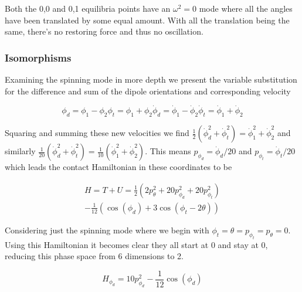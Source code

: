 \documentclass[prb,preprint]{revtex4-1}
\begin{document}
Both the 0,0 and 0,1 equilibria points have an $\omega^2=0$ mode where all the angles have been translated by some equal amount. With all the translation being the same, there's no restoring force and thus no oscillation.


\subsubsection{Isomorphisms} Examining the spinning mode in more depth we present the variable substitution for the difference and sum of the dipole orientations and corresponding velocity

\begin{subequations}
	\begin{equation}
		\phi_d = \phi_1-\phi_2
	\end{equation}
	\begin{equation}
		\phi_t = \phi_1+\phi_2
	\end{equation}
	\begin{equation}
		\dot\phi_d = \dot\phi_1-\dot\phi_2
	\end{equation}
	\begin{equation}
		\dot\phi_t = \dot\phi_1+\dot\phi_2
	\end{equation}
\end{subequations}

Squaring and summing these new velocities we find 
$\frac{1}{2}(\dot\phi_d^2 + \dot\phi_t^2) = \dot\phi_1^2+\dot\phi_2^2$ and similarly $\frac{1}{20}(\dot\phi_d^2 + \dot\phi_t^2) = \frac{1}{10}(\dot\phi_1^2+\dot\phi_2^2)$.
This means $p_{\phi_d}=\dot\phi_d/20$ and $p_{\phi_t}=\dot\phi_t/20$ which leads the contact Hamiltonian in these coordinates to be

\begin{equation}
  \begin{multlined}
	H=T+U=
	\frac{1}{2}\left (
	2 p_\theta^2
	+20 p_{\phi_d}^2 
	+20 p_{\phi_t}^2      
        \right )
        \\
	-
	\frac{1}{12}
	(
	        \cos(\phi_d)
	        +3\cos(\phi_t-2\theta)
	    )
  \end{multlined}
\end{equation}

Considering just the spinning mode where we begin with $\phi_t=\theta=p_{\phi_t}=p_\theta=0$. Using this Hamiltonian it becomes clear they all start at 0 and stay at 0, reducing this phase space from 6 dimensions to 2.

\begin{equation}
	H_{\phi_d}=
	10 p_{\phi_d}^2 
	-
	\frac{1}{12}
        \cos(\phi_d)
\end{equation}
\end{document}
